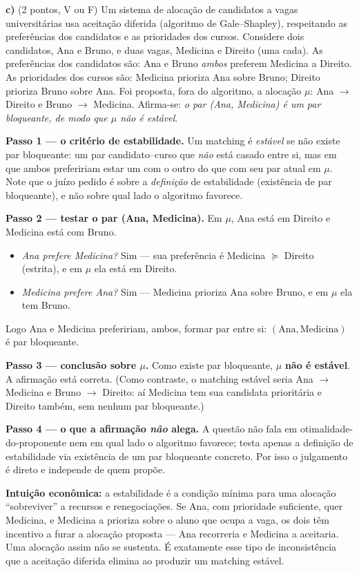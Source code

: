 \textbf{c)} (2 pontos, V ou F) Um sistema de aloca\c{c}\~ao de candidatos a vagas universit\'arias usa aceita\c{c}\~ao diferida (algoritmo de Gale--Shapley), respeitando as prefer\^encias dos candidatos e as prioridades dos cursos. Considere dois candidatos, Ana e Bruno, e duas vagas, Medicina e Direito (uma cada). As prefer\^encias dos candidatos s\~ao: Ana e Bruno \emph{ambos} preferem Medicina a Direito. As prioridades dos cursos s\~ao: Medicina prioriza Ana sobre Bruno; Direito prioriza Bruno sobre Ana. Foi proposta, fora do algoritmo, a aloca\c{c}\~ao $\mu$: Ana $\to$ Direito e Bruno $\to$ Medicina. Afirma-se: \emph{o par (Ana, Medicina) \'e um par bloqueante, de modo que $\mu$ n\~ao \'e est\'avel}.

\begin{solucao}
\textbf{Passo 1 --- o crit\'erio de estabilidade.} Um matching \'e \emph{est\'avel} se n\~ao existe par bloqueante: um par candidato--curso que \emph{n\~ao} est\'a casado entre si, mas em que ambos prefeririam estar um com o outro do que com seu par atual em $\mu$. Note que o ju\'izo pedido \'e sobre a \emph{defini\c{c}\~ao} de estabilidade (exist\^encia de par bloqueante), e n\~ao sobre qual lado o algoritmo favorece.

\textbf{Passo 2 --- testar o par (Ana, Medicina).} Em $\mu$, Ana est\'a em Direito e Medicina est\'a com Bruno.
\begin{itemize}
\item \emph{Ana prefere Medicina?} Sim --- sua prefer\^encia \'e Medicina $\succeq$ Direito (estrita), e em $\mu$ ela est\'a em Direito.
\item \emph{Medicina prefere Ana?} Sim --- Medicina prioriza Ana sobre Bruno, e em $\mu$ ela tem Bruno.
\end{itemize}
Logo Ana e Medicina prefeririam, ambos, formar par entre si: $(\text{Ana},\text{Medicina})$ \'e par bloqueante.

\textbf{Passo 3 --- conclus\~ao sobre $\mu$.} Como existe par bloqueante, $\mu$ \textbf{n\~ao \'e est\'avel}. A afirma\c{c}\~ao est\'a correta. (Como contraste, o matching est\'avel seria Ana $\to$ Medicina e Bruno $\to$ Direito: a\'i Medicina tem sua candidata priorit\'aria e Direito tamb\'em, sem nenhum par bloqueante.)

\textbf{Passo 4 --- o que a afirma\c{c}\~ao \emph{n\~ao} alega.} A quest\~ao n\~ao fala em otimalidade-do-proponente nem em qual lado o algoritmo favorece; testa apenas a defini\c{c}\~ao de estabilidade via exist\^encia de um par bloqueante concreto. Por isso o julgamento \'e direto e independe de quem prop\~oe.

\textbf{Intui\c{c}\~ao econ\^omica:} a estabilidade \'e a condi\c{c}\~ao m\'inima para uma aloca\c{c}\~ao ``sobreviver'' a recursos e renegocia\c{c}\~oes. Se Ana, com prioridade suficiente, quer Medicina, e Medicina a prioriza sobre o aluno que ocupa a vaga, os dois t\^em incentivo a furar a aloca\c{c}\~ao proposta --- Ana recorreria e Medicina a aceitaria. Uma aloca\c{c}\~ao assim n\~ao se sustenta. \'E exatamente esse tipo de inconsist\^encia que a aceita\c{c}\~ao diferida elimina ao produzir um matching est\'avel.
\end{solucao}

